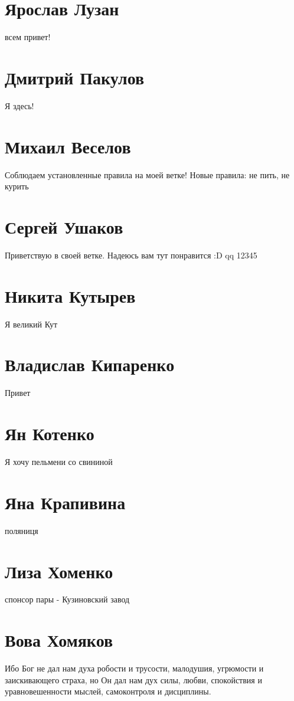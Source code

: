 \documentclass{article}
\begin{document}
\section*{Ярослав Лузан}
всем привет!

\section*{Дмитрий Пакулов}

Я здесь!

\section*{Михаил Веселов}

Соблюдаем установленные правила на моей ветке!
Новые правила: не пить, не курить

\section*{Сергей Ушаков}

Приветствую в своей ветке. Надеюсь вам тут понравится :D qq 12345

\section*{Никита Кутырев}
Я великий Кут
\section*{Владислав Кипаренко}
Привет
\section*{Ян Котенко}
Я хочу пельмени со свининой
\section*{Яна Крапивина}

поляниця
\section*{Лиза Хоменко}
спонсор пары - Кузиновский завод

\section*{Вова Хомяков}
Ибо Бог не дал нам духа робости и трусости, малодушия, угрюмости и заискивающего страха, но Он дал нам дух силы, любви, спокойствия и уравновешенности мыслей, самоконтроля и дисциплины.
\end{document}
